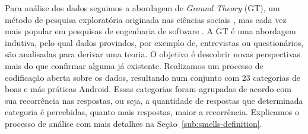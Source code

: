 Para análise dos dados seguimos a abordagem de \textit{Ground Theory} (GT), um método de pesquisa exploratória originada nas ciências sociais \cite{Strauss2007, GlaserStrauss1999}, mas cada vez mais popular em pesquisas de engenharia de software \cite{Adolph2011}. A GT é uma abordagem indutiva, pelo qual dados provindos, por exemplo de, entrevistas ou questionários, são analisadas para derivar uma teoria. O objetivo é descobrir novas perspectivas mais do que confirmar alguma já existente. Realizamos um processo de codificação aberta sobre os dados, resultando num conjunto com 23 categorias de boas e más práticas Android. Essas categorias foram agrupadas de acordo com sua recorrência nas respostas, ou seja, a quantidade de respostas que determinada categoria é percebidas, quanto mais respostas, maior a recorrência. Explicamos o processo de análise com mais detalhes na Seção~\ref{sub:smells-definition}.


